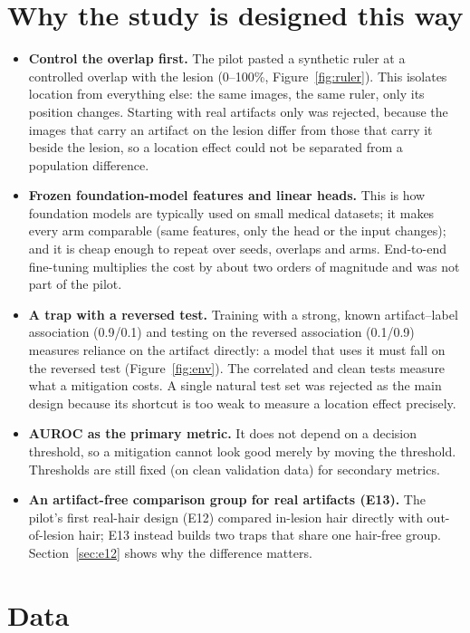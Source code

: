 \section{Why the study is designed this way}
\begin{itemize}[leftmargin=*]\itemsep1pt
\item \textbf{Control the overlap first.} The pilot pasted a synthetic ruler at a controlled overlap with the lesion
(0--100\%, Figure~\ref{fig:ruler}). This isolates location from everything else: the same images, the same ruler, only
its position changes. Starting with real artifacts only was rejected, because the images that carry an artifact on the
lesion differ from those that carry it beside the lesion, so a location effect could not be separated from a
population difference.
\item \textbf{Frozen foundation-model features and linear heads.} This is how foundation models are typically used on
small medical datasets; it makes every arm comparable (same features, only the head or the input changes); and it is
cheap enough to repeat over seeds, overlaps and arms. End-to-end fine-tuning multiplies the cost by about two orders
of magnitude and was not part of the pilot.
\item \textbf{A trap with a reversed test.} Training with a strong, known artifact--label association (0.9/0.1) and
testing on the reversed association (0.1/0.9) measures reliance on the artifact directly: a model that uses it must
fall on the reversed test (Figure~\ref{fig:env}). The correlated and clean tests measure what a mitigation costs. A
single natural test set was rejected as the main design because its shortcut is too weak to measure a location effect
precisely.
\item \textbf{AUROC as the primary metric.} It does not depend on a decision threshold, so a mitigation cannot look good
merely by moving the threshold. Thresholds are still fixed (on clean validation data) for secondary metrics.
\item \textbf{An artifact-free comparison group for real artifacts (E13).} The pilot's first real-hair design (E12)
compared in-lesion hair directly with out-of-lesion hair; E13 instead builds two traps that share one hair-free group.
Section~\ref{sec:e12} shows why the difference matters.
\end{itemize}

\section{Data}
